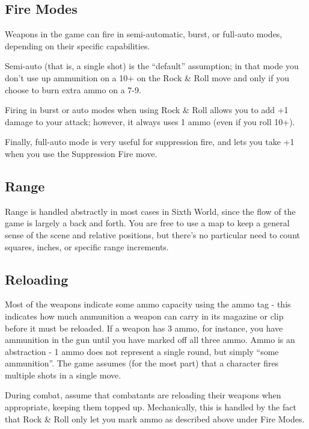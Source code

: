 \subsection*{Fire Modes}
Weapons in the game can fire in semi-automatic, burst, or full-auto modes, depending on their specific capabilities.

Semi-auto (that is, a single shot) is the ``default'' assumption; in that mode you don't use up ammunition on a 10+ on the Rock \& Roll move and only if you choose to burn extra ammo on a 7-9.

Firing in burst or auto modes when using Rock \& Roll allows you to add +1 damage to your attack; however, it always uses 1 ammo (even if you roll 10+).

Finally, full-auto mode is very useful for suppression fire, and lets you take +1 when you use the Suppression Fire move.



\subsection*{Range}
Range is handled abstractly in most cases in Sixth World, since the flow of the game is largely a back and forth. You are free to use a map to keep a general sense of the scene and relative positions, but there’s no particular need to count squares, inches, or specific range increments.


\subsection*{Reloading}
Most of the weapons indicate some ammo capacity using the ammo tag - this indicates how much ammunition a weapon can carry in its magazine or clip before it must be reloaded. If a weapon has 3 ammo, for instance, you have ammunition in the gun until you have marked off all three ammo. Ammo is an abstraction - 1 ammo does not represent a single round, but simply ``some ammunition''. The game assumes (for the most part) that a character fires multiple shots in a single move.

During combat, assume that combatants are reloading their weapons when appropriate, keeping them topped up. Mechanically, this is handled by the fact that Rock \& Roll only let you mark ammo as described above under Fire Modes.

